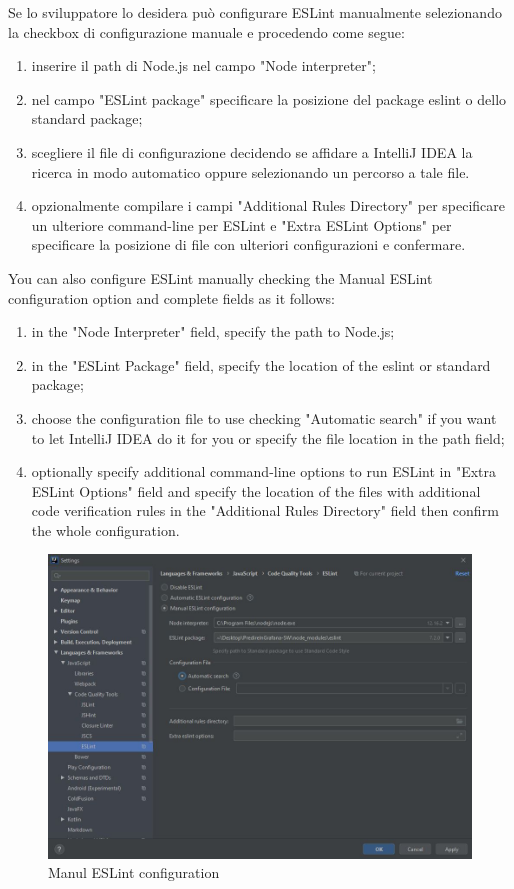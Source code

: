 	Se lo sviluppatore lo desidera può configurare ESLint manualmente selezionando la checkbox di configurazione manuale e procedendo come segue: 
	\begin{enumerate}
		\item inserire il path di Node.js nel campo "Node interpreter";
		\item nel campo "ESLint package" specificare la posizione del package eslint o dello standard package;
		\item scegliere il file di configurazione decidendo se affidare a IntelliJ IDEA la ricerca in modo automatico oppure selezionando un percorso a tale file. 
		\item opzionalmente compilare i campi "Additional Rules Directory" per specificare un ulteriore command-line per ESLint e  "Extra ESLint Options" per specificare la posizione di file con ulteriori configurazioni e confermare.
	\end{enumerate}
		
		You can also configure ESLint manually checking the Manual ESLint configuration option and complete fields as it follows:
		\begin{enumerate}
			\item in the "Node Interpreter" field, specify the path to Node.js;
			\item in the "ESLint Package" field, specify the location of the eslint or standard package;
			\item choose the configuration file to use checking "Automatic search" if you want to let IntelliJ IDEA do it for you or specify the file location in the path field;
			\item optionally specify additional command-line options to run ESLint in "Extra ESLint Options" field and specify the location of the files with additional code verification rules in the "Additional Rules Directory" field then confirm the whole configuration.
		\end{enumerate}
		

\begin{figure}[H]
		\centering
		\includegraphics[scale=0.60]{../Developer_manual/img/manual_eslint_configuration.JPG}
		\caption{Manul ESLint configuration}
	\end{figure}	

